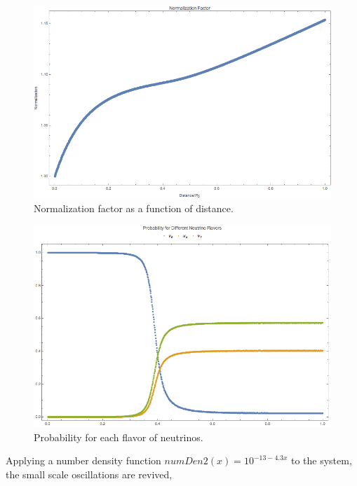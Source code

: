 \documentclass{tufte-handout}
\begin{document}
\begin{figure}
\centering
\includegraphics{assets/numericalMSW3Flavor-normalization}
\caption{Normalization factor as a function of distance.}
\label{fig:numericalMSW3Flavor-normalization}
\end{figure}


\begin{figure}
\centering
\includegraphics{assets/numericalMSW3Flavor-probabilities.png}
\caption{Probability for each flavor of neutrinos.}
\label{fig:numericalMSW3Flavor-probabilities}
\end{figure}



Applying a number density function $numDen2(x) = 10^{-13 - 4.3 x}$ to the system, the small scale oscillations are revived,
\end{document}
